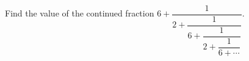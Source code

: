 Find the value of the continued fraction $6+\dfrac{1}{2+\dfrac{1}{6+\dfrac{1}{2+\dfrac{1}{6+\cdots}}}}$.
